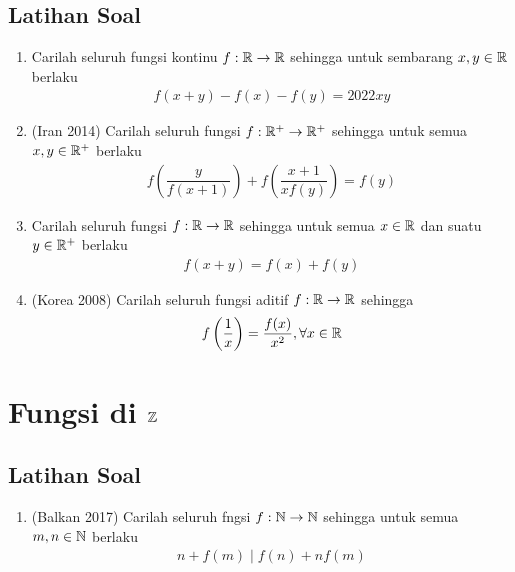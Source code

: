 \documentclass[11pt]{scrartcl}
\begin{document}
\subsection{Latihan Soal}
\begin{enumerate}
    \item Carilah seluruh fungsi kontinu $f:\mathbb R \to \mathbb R$ sehingga untuk sembarang $x,y \in \mathbb R$ berlaku
    \begin{align*}
        f(x+y)-f(x)-f(y)=2022xy
    \end{align*}
    \item (Iran 2014) Carilah seluruh fungsi $f:\mathbb R^+ \to \mathbb R^+$ sehingga untuk semua $x,y \in \mathbb R^+$ berlaku
    \begin{align*}
        f\left(\dfrac{y}{f(x+1)}\right)+f\left(\dfrac{x+1}{xf(y)}\right)=f(y)
    \end{align*}
    \item Carilah seluruh fungsi $f:\mathbb R \to \mathbb R$ sehingga untuk semua $x \in \mathbb R$ dan suatu $y \in \mathbb R^+$ berlaku
    \begin{align*}
        f(x+y)=f(x)+f(y)
    \end{align*}
    \item (Korea 2008) Carilah seluruh fungsi aditif $f:\mathbb R \to \mathbb R$ sehingga
    \begin{align*}
        f\left(\dfrac{1}{x}\right)=\dfrac{f(x)}{x^2}, \forall x \in \mathbb R
    \end{align*}
\end{enumerate}

\section{Fungsi di $\mathbb Z$}
\subsection{Latihan Soal}
\begin{enumerate}
    \item (Balkan 2017) Carilah seluruh fngsi $f:\mathbb N \to \mathbb N$ sehingga untuk semua $m,n \in \mathbb N$ berlaku
    \begin{align*}
        n+f(m) \mid f(n)+nf(m)
    \end{align*}
\end{enumerate}
\end{document}
